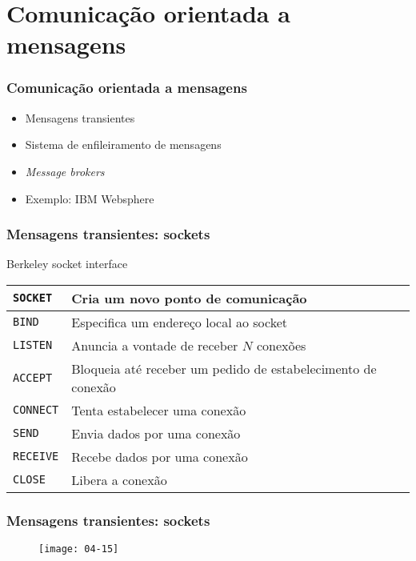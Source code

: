 \documentclass[Ligatures=TeX,table,brazil,svgnames,usetotalslideindicator,compress,10pt]{beamer}
\begin{document}
\section{Comunicação orientada a mensagens}

\begin{frame}
  \frametitle{Comunicação orientada a mensagens}
  \begin{itemize}
  \item Mensagens transientes
  \item Sistema de enfileiramento de mensagens
  \item \textit{Message brokers}
  \item Exemplo: IBM Websphere
  \end{itemize}
\end{frame}

\begin{frame}
  \frametitle{Mensagens transientes: sockets}
  \begin{exampleblock}{Berkeley socket interface}
    \begin{center}
      \small
      \renewcommand{\arraystretch}{1.1}
      \begin{tabular}{|>{\texttt}l|l|}\hline
        \texttt{SOCKET}  & Cria um novo ponto de comunicação \\ \hline
        \texttt{BIND}    & Especifica um endereço local ao socket \\ \hline
        \texttt{LISTEN}  & Anuncia a vontade de receber $N$ conexões \\ \hline
        \texttt{ACCEPT}  & Bloqueia até receber um pedido de estabelecimento de conexão \\ \hline
        \texttt{CONNECT} & Tenta estabelecer uma conexão \\ \hline
        \texttt{SEND}    & Envia dados por uma conexão \\ \hline
        \texttt{RECEIVE} & Recebe dados por uma conexão \\ \hline
        \texttt{CLOSE}   & Libera a conexão \\ \hline
      \end{tabular}
    \end{center}
  \end{exampleblock}
\end{frame}

\begin{frame}
  \frametitle{Mensagens transientes: sockets}
  \begin{figure}
    \centering
    \texttt{[image: 04-15]}
  \end{figure}
\end{frame}
\end{document}
